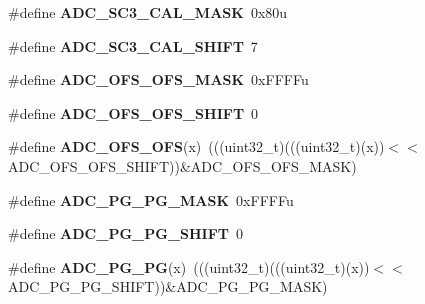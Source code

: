 \begin{DoxyCompactItemize}
\item 
\#define {\bfseries A\+D\+C\+\_\+\+S\+C3\+\_\+\+C\+A\+L\+\_\+\+M\+A\+SK}~0x80u\hypertarget{group__ADC__Register__Masks_ga0ec589c9101684eeac4af85452ed3673}{}\label{group__ADC__Register__Masks_ga0ec589c9101684eeac4af85452ed3673}

\item 
\#define {\bfseries A\+D\+C\+\_\+\+S\+C3\+\_\+\+C\+A\+L\+\_\+\+S\+H\+I\+FT}~7\hypertarget{group__ADC__Register__Masks_ga808101f85e6ceff194c212faacf4bd9d}{}\label{group__ADC__Register__Masks_ga808101f85e6ceff194c212faacf4bd9d}

\item 
\#define {\bfseries A\+D\+C\+\_\+\+O\+F\+S\+\_\+\+O\+F\+S\+\_\+\+M\+A\+SK}~0x\+F\+F\+F\+Fu\hypertarget{group__ADC__Register__Masks_ga1532ae43eb63d6c071f531cca89fdb68}{}\label{group__ADC__Register__Masks_ga1532ae43eb63d6c071f531cca89fdb68}

\item 
\#define {\bfseries A\+D\+C\+\_\+\+O\+F\+S\+\_\+\+O\+F\+S\+\_\+\+S\+H\+I\+FT}~0\hypertarget{group__ADC__Register__Masks_ga86de5d25a5433db6e96700e2d000ad07}{}\label{group__ADC__Register__Masks_ga86de5d25a5433db6e96700e2d000ad07}

\item 
\#define {\bfseries A\+D\+C\+\_\+\+O\+F\+S\+\_\+\+O\+FS}(x)~(((uint32\+\_\+t)(((uint32\+\_\+t)(x))$<$$<$A\+D\+C\+\_\+\+O\+F\+S\+\_\+\+O\+F\+S\+\_\+\+S\+H\+I\+FT))\&A\+D\+C\+\_\+\+O\+F\+S\+\_\+\+O\+F\+S\+\_\+\+M\+A\+SK)\hypertarget{group__ADC__Register__Masks_gad48888faa6b880f4011253b53413f37b}{}\label{group__ADC__Register__Masks_gad48888faa6b880f4011253b53413f37b}

\item 
\#define {\bfseries A\+D\+C\+\_\+\+P\+G\+\_\+\+P\+G\+\_\+\+M\+A\+SK}~0x\+F\+F\+F\+Fu\hypertarget{group__ADC__Register__Masks_ga0619279d8dcf43af1fda9f27090ae51b}{}\label{group__ADC__Register__Masks_ga0619279d8dcf43af1fda9f27090ae51b}

\item 
\#define {\bfseries A\+D\+C\+\_\+\+P\+G\+\_\+\+P\+G\+\_\+\+S\+H\+I\+FT}~0\hypertarget{group__ADC__Register__Masks_ga014623fb35c473d12ff7fc64c3e8cfe3}{}\label{group__ADC__Register__Masks_ga014623fb35c473d12ff7fc64c3e8cfe3}

\item 
\#define {\bfseries A\+D\+C\+\_\+\+P\+G\+\_\+\+PG}(x)~(((uint32\+\_\+t)(((uint32\+\_\+t)(x))$<$$<$A\+D\+C\+\_\+\+P\+G\+\_\+\+P\+G\+\_\+\+S\+H\+I\+FT))\&A\+D\+C\+\_\+\+P\+G\+\_\+\+P\+G\+\_\+\+M\+A\+SK)\hypertarget{group__ADC__Register__Masks_ga4b6bf1c895aa431e08bed733de13e71e}{}\label{group__ADC__Register__Masks_ga4b6bf1c895aa431e08bed733de13e71e}


\end{DoxyCompactItemize}
